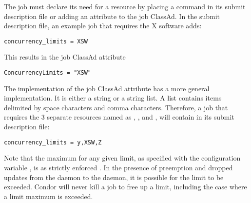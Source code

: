 The job must declare its need for a resource by placing a command
in its submit description file or adding an attribute to the
job ClassAd.
In the submit description file, an example job that requires
the X software adds:
\begin{verbatim}
concurrency_limits = XSW
\end{verbatim}
This results in the job ClassAd attribute
\begin{verbatim}
ConcurrencyLimits = "XSW"
\end{verbatim}

The implementation of the job ClassAd attribute 
has a more general implementation.
It is either a string or a string list.
A list contains items delimited by space characters and comma characters.
Therefore, a job that requires the 3 separate resources 
named as  , , and  , 
will contain in its submit description file:
\begin{verbatim}
concurrency_limits = y,XSW,Z
\end{verbatim}

Note that the maximum for any given limit,
as specified with the configuration variable ,
is as strictly enforced .
In the presence of preemption and dropped updates from
the  daemon to the  daemon,
it is possible for the limit to be exceeded.
Condor will never kill a job to free up a limit,
including the case where a limit maximum is exceeded. 
